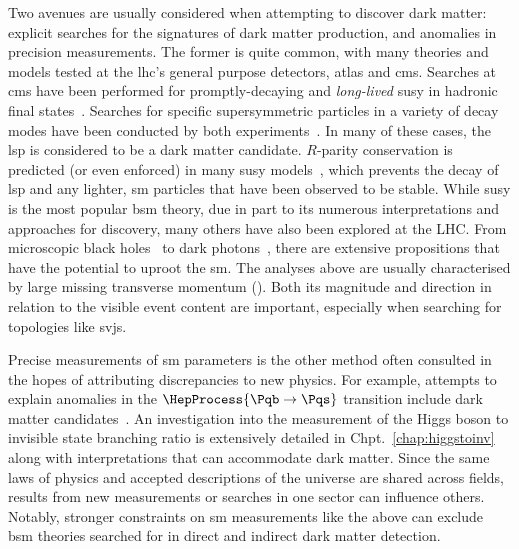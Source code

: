 Two avenues are usually considered when attempting to discover dark matter: explicit searches for the signatures of dark matter production, and anomalies in precision measurements. The former is quite common, with many theories and models tested at the \acrshort{lhc}'s general purpose detectors, \acrshort{atlas} and \acrshort{cms}. Searches at \acrshort{cms} have been performed for promptly-decaying and \emph{long-lived} \acrlong{susy} in hadronic final states~\cite{CMS-PAPER-SUS-15-005-published,SUS16038published}. Searches for specific supersymmetric particles in a variety of decay modes have been conducted by both experiments~\cite{CANEPA2019100033}. In many of these cases, the \acrfull{lsp} is considered to be a dark matter candidate. $R$-parity conservation is predicted (or even enforced) in many \acrshort{susy} models~\cite{Martin:1997ns}, which prevents the decay of \acrshort{lsp} and any lighter, \acrlong{sm} particles that have been observed to be stable. While \acrlong{susy} is the most popular \acrshort{bsm} theory, due in part to its numerous interpretations and approaches for discovery, many others have also been explored at the LHC. From microscopic black holes~\cite{Khachatryan:2010wx} to dark photons~\cite{dark_photons_CMS_2019}, there are extensive propositions that have the potential to uproot the \acrlong{sm}. The analyses above are usually characterised by large missing transverse momentum (\ptvecmiss). Both its magnitude and direction in relation to the visible event content are important, especially when searching for topologies like \glspl{svj}. 

Precise measurements of \acrlong{sm} parameters is the other method often consulted in the hopes of attributing discrepancies to new physics. For example, attempts to explain anomalies in the $\HepProcess{\Pqb \to \Pqs}$ transition include dark matter candidates~\cite{Vicente:2018xbv,another_b_s_anomaly_paper}. An investigation into the measurement of the Higgs boson to invisible state branching ratio is extensively detailed in Chpt.~\ref{chap:higgstoinv} along with interpretations that can accommodate dark matter. Since the same laws of physics and accepted descriptions of the universe are shared across fields, results from new measurements or searches in one sector can influence others. Notably, stronger constraints on \acrlong{sm} measurements like the above can exclude \acrshort{bsm} theories searched for in direct and indirect dark matter detection.




